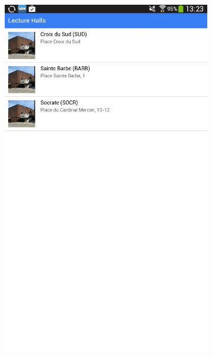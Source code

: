 \documentclass{eplmastersthesis}
\begin{document}
\begin{figure}[H]
    \centering
\begin{subfigure}[b]{0.3\textwidth}
        \includegraphics[width=\textwidth]{Images/InVision/12211075_10207057657552707_718284172_o.jpg}
    \end{subfigure}
    ~ %
    \begin{subfigure}[b]{0.3\textwidth}

\end{subfigure}
\end{figure}
\end{document}
